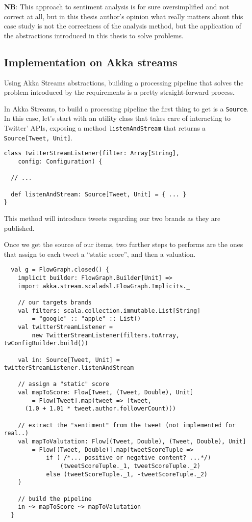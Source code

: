\textbf{NB}: This approach to sentiment analysis is for sure
oversimplified and not correct at all, but in this thesis author's
opinion what really matters about this case study is not the
correctness of the analysis method, but the application of the
abstractions introduced in this thesis to solve problems.

\subsection{Implementation on Akka
streams}\label{implementation-on-akka-streams}

Using Akka Streams abstractions, building a processing pipeline that
solves the problem introduced by the requirements is a pretty
straight-forward process.

In Akka Streams, to build a processing pipeline the first thing to get
is a \texttt{Source}. In this case, let's start with an utility class
that takes care of interacting to Twitter' APIs, exposing a method
\texttt{listenAndStream} that returns a
\texttt{Source{[}Tweet,\ Unit{]}}.

\begin{verbatim}
class TwitterStreamListener(filter: Array[String],
    config: Configuration) {

  // ...

  def listenAndStream: Source[Tweet, Unit] = { ... }
}
\end{verbatim}

This method will introduce tweets regarding our two brands as they are
published.

Once we get the source of our items, two further steps to performs are
the ones that assign to each tweet a ``static score'', and then a
valuation.

\begin{verbatim}
  val g = FlowGraph.closed() {
    implicit builder: FlowGraph.Builder[Unit] =>
    import akka.stream.scaladsl.FlowGraph.Implicits._

    // our targets brands
    val filters: scala.collection.immutable.List[String]
        = "google" :: "apple" :: List()
    val twitterStreamListener =
        new TwitterStreamListener(filters.toArray, twConfigBuilder.build())

    val in: Source[Tweet, Unit] = twitterStreamListener.listenAndStream

    // assign a "static" score
    val mapToScore: Flow[Tweet, (Tweet, Double), Unit]
        = Flow[Tweet].map(tweet => (tweet,
      (1.0 + 1.01 * tweet.author.followerCount)))

    // extract the "sentiment" from the tweet (not implemented for real..)
    val mapToValutation: Flow[(Tweet, Double), (Tweet, Double), Unit]
        = Flow[(Tweet, Double)].map(tweetScoreTuple =>
            if ( /*... positive or negative content? ...*/)
                (tweetScoreTuple._1, tweetScoreTuple._2)
            else (tweetScoreTuple._1, -tweetScoreTuple._2)
    )

    // build the pipeline
    in ~> mapToScore ~> mapToValutation
  }
\end{verbatim}

